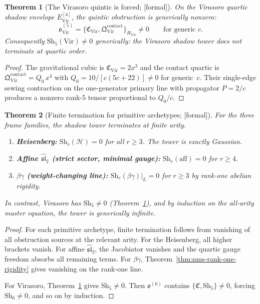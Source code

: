 \documentclass[11pt,oneside]{memoir}
\numberwithin{equation}{chapter}
\newtheorem{theorem}{Theorem}[chapter]
\theoremstyle{definition}
\newcommand{\ClaimStatusProvedHere}{\textnormal{[formal]}}
\begin{document}
\begin{theorem}[The Virasoro quintic is forced; \ClaimStatusProvedHere]
\label{thm:nms-virasoro-quintic-forced}
On the Virasoro quartic shadow envelope $E^{[4]}_{\mathrm{Vir}}$, the quintic obstruction is generically nonzero:
\begin{equation}
\label{eq:nms-virasoro-quintic-obstruction}
\mathfrak o_{\mathrm{Vir}}^{(5)}
=
\{\mathfrak C_{\mathrm{Vir}},\mathfrak Q^{\mathrm{contact}}_{\mathrm{Vir}}\}_{H_{\mathrm{Vir}}}
\neq 0
\qquad
\text{for generic $c$}.
\end{equation}
Consequently $\mathrm{Sh}_5(\mathrm{Vir})\neq 0$ generically: the Virasoro shadow tower does not terminate at quartic order.
\end{theorem}

\begin{proof}
The gravitational cubic is $\mathfrak C_{\mathrm{Vir}}=2x^3$ and the contact quartic is $\mathfrak Q^{\mathrm{contact}}_{\mathrm{Vir}}=Q_0\,x^4$ with $Q_0=10/[c(5c+22)]\neq 0$ for generic~$c$.  Their single-edge sewing contraction on the one-generator primary line with propagator $P=2/c$ produces a nonzero rank-$5$ tensor proportional to $Q_0/c$.\qedhere
\end{proof}

\begin{theorem}[Finite termination for primitive archetypes; \ClaimStatusProvedHere]
\label{thm:nms-finite-termination}
For the three frame families, the shadow tower terminates at finite arity.
\begin{enumerate}[label=\textup{(\roman*)}]
\item \textbf{Heisenberg:} $\mathrm{Sh}_r(\mathcal H)=0$ for all $r\ge 3$.  The tower is exactly Gaussian.
\item \textbf{Affine $\widehat{\mathfrak{sl}}_2$ \textup{(strict sector, minimal gauge):}} $\mathrm{Sh}_r(\mathrm{aff})=0$ for $r\ge 4$.
\item \textbf{$\beta\gamma$ \textup{(weight-changing line):}} $\mathrm{Sh}_r(\beta\gamma)|_L=0$ for $r\ge 3$ by rank-one abelian rigidity.
\end{enumerate}
In contrast, Virasoro has $\mathrm{Sh}_5\neq 0$ (Theorem~\ref{thm:nms-virasoro-quintic-forced}), and by induction on the all-arity master equation, the tower is generically infinite.
\end{theorem}

\begin{proof}
For each primitive archetype, finite termination follows from vanishing of all obstruction sources at the relevant arity.  For the Heisenberg, all higher brackets vanish.  For affine $\widehat{\mathfrak{sl}}_2$, the Jacobiator vanishes and the quartic gauge freedom absorbs all remaining terms.  For $\beta\gamma$, Theorem~\ref{thm:nms-rank-one-rigidity} gives vanishing on the rank-one line.

For Virasoro, Theorem~\ref{thm:nms-virasoro-quintic-forced} gives $\mathrm{Sh}_5\neq 0$.  Then $\mathfrak o^{(6)}$ contains $\{\mathfrak C,\mathrm{Sh}_5\}\neq 0$, forcing $\mathrm{Sh}_6\neq 0$, and so on by induction.\qedhere
\end{proof}
\end{document}
